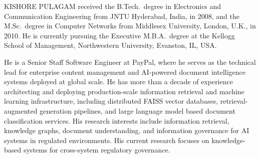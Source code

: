 \documentclass{ieeeaccess}
\begin{document}
\begin{IEEEbiographynophoto}{KISHORE PULAGAM}
received the B.Tech.\ degree in Electronics and Communication Engineering from JNTU Hyderabad, India, in 2008, and the M.Sc.\ degree in Computer Networks from Middlesex University, London, U.K., in 2010. He is currently pursuing the Executive M.B.A.\ degree at the Kellogg School of Management, Northwestern University, Evanston, IL, USA.

He is a Senior Staff Software Engineer at PayPal, where he serves as the technical lead for enterprise content management and AI-powered document intelligence systems deployed at global scale. He has more than a decade of experience architecting and deploying production-scale information retrieval and machine learning infrastructure, including distributed FAISS vector databases, retrieval-augmented generation pipelines, and large language model based document classification services. His research interests include information retrieval, knowledge graphs, document understanding, and information governance for AI systems in regulated environments. His current research focuses on knowledge-based systems for cross-system regulatory governance.
\end{IEEEbiographynophoto}

\EOD
\end{document}
